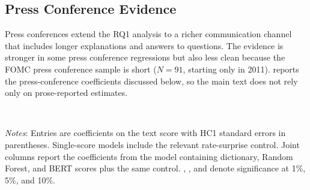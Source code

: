 \subsection{Press Conference Evidence}
\label{sec:res_pc_new}

Press conferences extend the RQ1 analysis to a richer communication channel
that includes longer explanations and answers to questions. The evidence is
stronger in some press conference regressions but also less clean because the
FOMC press conference sample is short ($N=91$, starting only in 2011).
 reports the press-conference coefficients
discussed below, so the main text does not rely only on prose-reported
estimates.

\begin{table}[H]
\centering
\caption{Press-conference market-reaction coefficients}
\label{tab:pc_coefficients_v31}
\\[4pt]
\begin{minipage}{\textwidth}
\footnotesize
\emph{Notes}: Entries are coefficients on the text score with HC1 standard
errors in parentheses. Single-score models include the relevant rate-surprise
control. Joint columns report the coefficients from the model containing
dictionary, Random Forest, and BERT scores plus the same control.
\sym{***}, \sym{**}, and \sym{*} denote significance at 1\%, 5\%, and 10\%.
\end{minipage}
\end{table}

